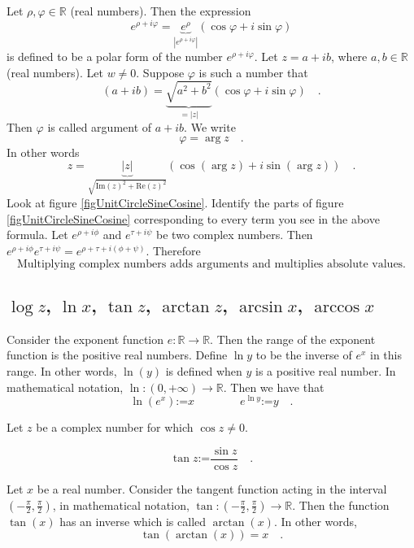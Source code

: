 \documentclass[12pt]{book}
\renewcommand{\Im}{\mathrm{Im}}
\renewcommand{\Re}{\mathrm{Re}}
\newcommand{\eqdef}{\textbf{:=}}
\begin{document}
Let $\rho, \varphi\in \mathbb R$ (real numbers). Then the expression
\[
e^{\rho+i\varphi}=\underbrace{e^{\rho}}_{|e^{\rho+i\varphi}|}(\cos \varphi + i\sin \varphi)
\]
is defined to be a polar form of the number $e^{\rho+i\varphi}$. Let $z=a+ib$, where $a, b\in \mathbb R$ (real numbers). Let $w\neq 0$. Suppose $\varphi$ is such a number that
\[
(a+ib)= \underbrace{\sqrt{a^2+b^2}}_{=|z|}(\cos \varphi + i \sin \varphi)\quad.
\]
Then $\varphi$ is called argument of $a+ib$. We write \[\varphi=\arg z\quad .\] In other words
\[z=\underbrace{|z|}_{\sqrt{\Im(z)^2+\Re(z)^2}}\left(\cos(\arg z) + i\sin (\arg z)\right)\quad .
\]
Look at figure \ref{figUnitCircleSineCosine}. Identify the parts of figure \ref{figUnitCircleSineCosine} corresponding to every term you see in the above formula.
Let $e^{\rho+i\phi}$ and $e^{\tau+i\psi}$ be two complex numbers. Then $e^{\rho+i\phi}e^{\tau+i\psi} = e^{\rho+\tau+i(\phi+\psi)}$. Therefore
\begin{equation}\boxed{
\text{Multiplying complex numbers adds arguments and multiplies absolute values.}
}
\end{equation}

\subsection{$\log z$, $\ln x$, $\tan z$, $\arctan z$, $\arcsin x$, $\arccos x$}
Consider the exponent function $e: \mathbb R \to \mathbb R$. Then the range of the exponent function is the positive real numbers. Define $\ln y$ to be the inverse of $e^x$ in this range. In other words, $\ln(y)$ is defined when $y$ is a positive real number. In mathematical notation, $\ln: (0,+\infty)\to \mathbb R$. Then we have that
\begin{equation}\boxed{
\ln (e^x)\eqdef x\quad\quad \quad \quad  e^{\ln y}\eqdef y\quad .
}
\end{equation}

Let $z$ be a complex number for which $\cos z\neq 0$.

\begin{equation}\boxed{
\tan z\eqdef \frac{\sin z}{\cos z}\quad .
}
\end{equation}

Let $x$ be a real number. Consider the tangent function acting in the interval $(-\frac{\pi}{2}, \frac{\pi}{2})$, in mathematical notation, $\tan :(-\frac{\pi}{2}, \frac{\pi}{2})\to \mathbb R$. Then the function $\tan(x)$ has an inverse which is called $\arctan(x)$. In other words,
\[
\tan (\arctan(x))= x\quad .
\]
\end{document}
